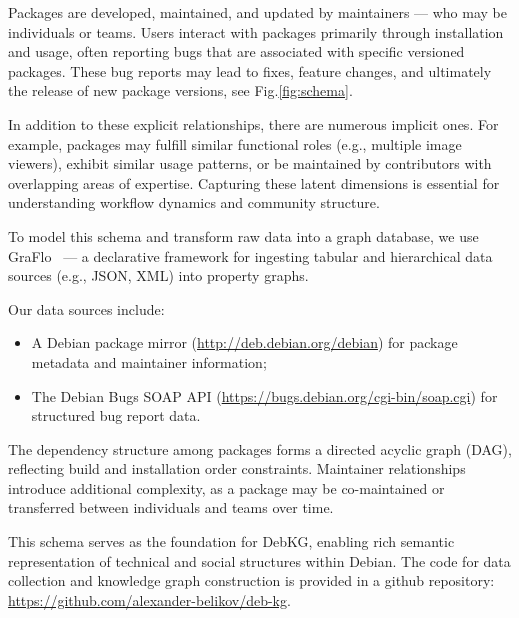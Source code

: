 \documentclass[10pt,oneside,a4paper, twocolumn]{article}
\begin{document}
    Packages are developed, maintained, and updated by maintainers — who may be individuals or teams.
    Users interact with packages primarily through installation and usage, often reporting bugs that are associated with specific versioned packages.
    These bug reports may lead to fixes, feature changes, and ultimately the release of new package versions, see Fig.\ref{fig:schema}.

    In addition to these explicit relationships, there are numerous implicit ones.
    For example, packages may fulfill similar functional roles (e.g., multiple image viewers), exhibit similar usage patterns, or be maintained by contributors with overlapping areas of expertise.
    Capturing these latent dimensions is essential for understanding workflow dynamics and community structure.

    To model this schema and transform raw data into a graph database, we use GraFlo~\cite{graflo} — a declarative framework for ingesting tabular and hierarchical data sources (e.g., JSON, XML) into property graphs.

    Our data sources include:
    \begin{itemize}
        \item A Debian package mirror (\url{http://deb.debian.org/debian}) for package metadata and maintainer information;
        \item The Debian Bugs SOAP API (\url{https://bugs.debian.org/cgi-bin/soap.cgi}) for structured bug report data.
    \end{itemize}

    The dependency structure among packages forms a directed acyclic graph (DAG), reflecting build and installation order constraints.
    Maintainer relationships introduce additional complexity, as a package may be co-maintained or transferred between individuals and teams over time.

    This schema serves as the foundation for DebKG, enabling rich semantic representation of technical and social structures within Debian.
    The code for data collection and knowledge graph construction is provided in a github repository: \url{https://github.com/alexander-belikov/deb-kg}.
\end{document}
